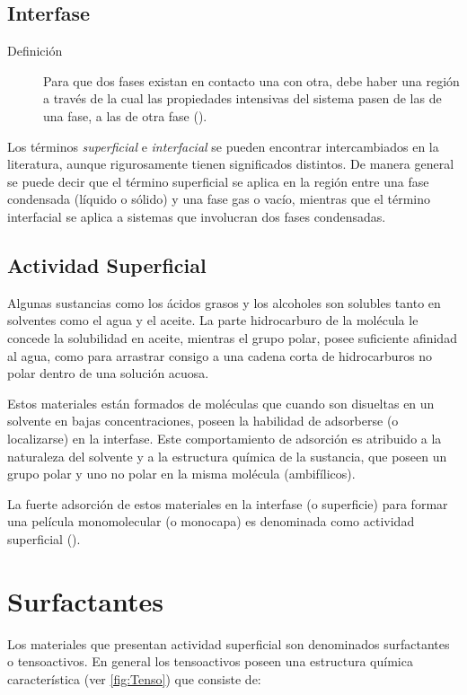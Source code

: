 \subsection{Interfase}

\begin{description}
    \item [Definición] Para que dos fases existan en contacto una con otra, debe haber una región a través de la cual las propiedades intensivas del sistema pasen de las de una fase, a las de otra fase (\cite{Cosgrove}).
\end{description}
    
 Los términos \emph{superficial} e \emph{interfacial} se pueden encontrar intercambiados en la literatura, aunque rigurosamente tienen significados distintos. De manera general se puede decir que el término superficial se aplica en la región entre una fase condensada (líquido o sólido) y una fase gas o vacío, mientras que el término interfacial se aplica a sistemas que involucran dos fases condensadas.
 
 \subsection{Actividad Superficial}
 Algunas sustancias como los ácidos grasos y los alcoholes son solubles tanto en solventes como el agua y el aceite. La parte hidrocarburo de la molécula le concede la solubilidad en aceite, mientras el grupo polar, posee suficiente afinidad al agua, como para arrastrar consigo a una cadena corta de hidrocarburos no polar dentro de una solución acuosa.
 
 Estos materiales están formados de moléculas que cuando son disueltas en un solvente en bajas concentraciones, poseen la habilidad de adsorberse (o localizarse) en la interfase. Este comportamiento de adsorción es atribuido a la naturaleza del solvente y a la estructura química de la sustancia, que poseen un grupo polar y uno no polar en la misma molécula (ambifílicos).
 
 La fuerte adsorción de estos materiales en la interfase (o superficie) para formar una película monomolecular (o monocapa) es denominada como actividad superficial (\cite{Duncan}).
 
 \section{Surfactantes}
 
 Los materiales que presentan actividad superficial son denominados surfactantes o tensoactivos. En general los tensoactivos poseen una estructura química característica (ver \autoref{fig:Tenso}) que consiste de:
 
